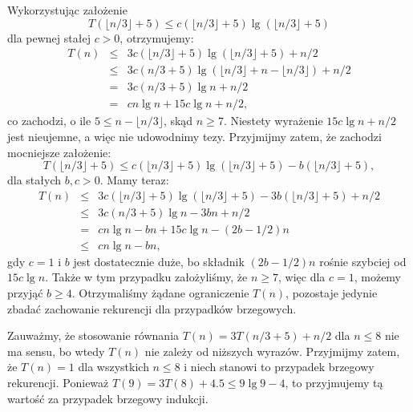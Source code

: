 Wykorzystując założenie
\[
	T(\lfloor n/3\rfloor+5)\le c(\lfloor n/3\rfloor+5)\lg(\lfloor n/3\rfloor+5)
\]
dla pewnej stałej $c>0$, otrzymujemy:
\begin{eqnarray*}
	T(n) &\le& 3c(\lfloor n/3\rfloor+5)\lg(\lfloor n/3\rfloor+5)+n/2 \\
	&\le& 3c(n/3+5)\lg(\lfloor n/3\rfloor+n-\lfloor n/3\rfloor)+n/2 \\
	&=& 3c(n/3+5)\lg n+n/2 \\
	&=& cn\lg n+15c\lg n+n/2,
\end{eqnarray*}
co zachodzi, o ile $5\le n-\lfloor n/3\rfloor$, skąd $n\ge 7$. Niestety wyrażenie $15c\lg n+n/2$ jest nieujemne, a więc nie udowodnimy tezy. Przyjmijmy zatem, że zachodzi mocniejsze założenie:
\[
	T(\lfloor n/3\rfloor+5)\le c(\lfloor n/3\rfloor+5)\lg(\lfloor n/3\rfloor+5)-b(\lfloor n/3\rfloor+5),
\]
dla stałych $b,c>0$. Mamy teraz:
\begin{eqnarray*}
	T(n) &\le& 3c(\lfloor n/3\rfloor+5)\lg(\lfloor n/3\rfloor+5)-3b(\lfloor n/3\rfloor+5)+n/2 \\
	&\le& 3c(n/3+5)\lg n-3bn+n/2 \\
	&=& cn\lg n-bn+15c\lg n-(2b-1/2)n \\
	&\le& cn\lg n-bn,
\end{eqnarray*}
gdy $c=1$ i $b$ jest dostatecznie duże, bo składnik $(2b-1/2)n$ rośnie szybciej od $15c\lg n$. Także w tym przypadku założyliśmy, że $n\ge 7$, więc dla $c=1$, możemy przyjąć $b\ge 4$. Otrzymaliśmy żądane ograniczenie $T(n)$, pozostaje jedynie zbadać zachowanie rekurencji dla przypadków brzegowych.

Zauważmy, że stosowanie równania $T(n)=3T(n/3+5)+n/2$ dla $n\le 8$ nie ma sensu, bo wtedy $T(n)$ nie zależy od niższych wyrazów. Przyjmijmy zatem, że $T(n)=1$ dla wszystkich $n\le 8$ i niech stanowi to przypadek brzegowy rekurencji. Ponieważ $T(9)=3T(8)+4.5\le 9\lg 9-4$, to przyjmujemy tą wartość za przypadek brzegowy indukcji.

